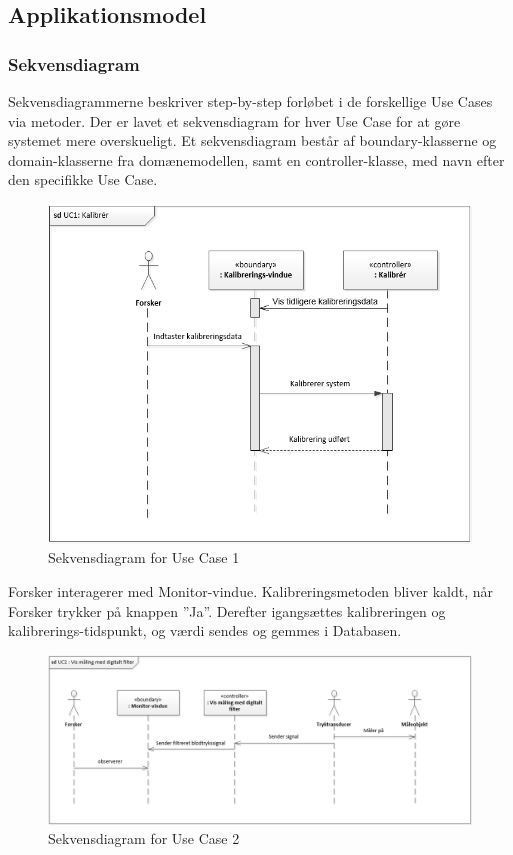 \subsection{Applikationsmodel}

\subsubsection{Sekvensdiagram}
Sekvensdiagrammerne beskriver step-by-step forløbet i de forskellige Use Cases via metoder. Der er lavet et sekvensdiagram for hver Use Case for at gøre systemet mere overskueligt. Et sekvensdiagram består af boundary-klasserne og domain-klasserne fra domænemodellen, samt en controller-klasse, med navn efter den specifikke Use Case.

\begin{figure}[H]
	\centering
	\includegraphics[width=1\textwidth]{Figurer/UC1_SD}
	\caption{Sekvensdiagram for Use Case 1}
\end{figure}

Forsker interagerer med Monitor-vindue. Kalibreringsmetoden bliver kaldt, når Forsker trykker på knappen ”Ja”. Derefter igangsættes kalibreringen og kalibrerings-tidspunkt, og værdi sendes og gemmes i Databasen. 

\begin{figure}[H]
	\centering
	\includegraphics[width=1\textwidth]{Figurer/UC2_SD}
	\caption{Sekvensdiagram for Use Case 2}
\end{figure}

